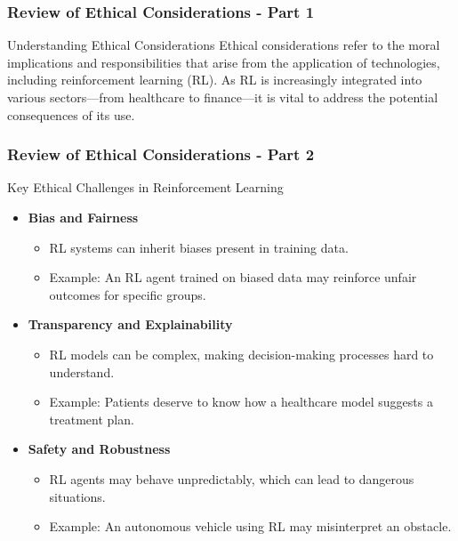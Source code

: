 \documentclass{beamer}
\begin{document}
\begin{frame}[fragile]
    \frametitle{Review of Ethical Considerations - Part 1}
    \begin{block}{Understanding Ethical Considerations}
        Ethical considerations refer to the moral implications and responsibilities that arise from the application of technologies, including reinforcement learning (RL). As RL is increasingly integrated into various sectors—from healthcare to finance—it is vital to address the potential consequences of its use.
    \end{block}
\end{frame}

\begin{frame}[fragile]
    \frametitle{Review of Ethical Considerations - Part 2}
    \begin{block}{Key Ethical Challenges in Reinforcement Learning}
        \begin{itemize}
            \item \textbf{Bias and Fairness}
                \begin{itemize}
                    \item RL systems can inherit biases present in training data.
                    \item Example: An RL agent trained on biased data may reinforce unfair outcomes for specific groups.
                \end{itemize}
            
            \item \textbf{Transparency and Explainability}
                \begin{itemize}
                    \item RL models can be complex, making decision-making processes hard to understand.
                    \item Example: Patients deserve to know how a healthcare model suggests a treatment plan.
                \end{itemize}
            
            \item \textbf{Safety and Robustness}
                \begin{itemize}
                    \item RL agents may behave unpredictably, which can lead to dangerous situations.
                    \item Example: An autonomous vehicle using RL may misinterpret an obstacle.
                \end{itemize}
            

\end{itemize}
\end{block}
\end{frame}
\end{document}
